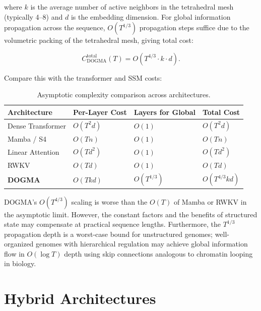 where $k$ is the average number of active neighbors in the tetrahedral mesh (typically 4--8) and $d$ is the embedding dimension. For global information propagation across the sequence, $O(T^{1/3})$ propagation steps suffice due to the volumetric packing of the tetrahedral mesh, giving total cost:

\begin{equation}
C_{\text{DOGMA}}^{\text{total}}(T) = O(T^{4/3} \cdot k \cdot d).
\end{equation}

Compare this with the transformer and SSM costs:

\begin{table}[H]
\centering
\caption{Asymptotic complexity comparison across architectures.}
\label{tab:complexity}
\renewcommand{\arraystretch}{1.15}
\begin{tabularx}{0.95\textwidth}{L{3.5cm} C{3cm} C{2.5cm} Y}
\toprule
\textbf{Architecture} & \textbf{Per-Layer Cost} & \textbf{Layers for Global} & \textbf{Total Cost} \\
\midrule
Dense Transformer & $O(T^2 d)$ & $O(1)$ & $O(T^2 d)$ \\
Mamba / S4 & $O(T n)$ & $O(1)$ & $O(T n)$ \\
Linear Attention & $O(T d^2)$ & $O(1)$ & $O(T d^2)$ \\
RWKV & $O(T d)$ & $O(1)$ & $O(T d)$ \\
\textbf{DOGMA} & $O(T k d)$ & $O(T^{1/3})$ & $O(T^{4/3} k d)$ \\
\bottomrule
\end{tabularx}
\end{table}

\begin{remark}
DOGMA's $O(T^{4/3})$ scaling is worse than the $O(T)$ of Mamba or RWKV in the asymptotic limit. However, the constant factors and the benefits of structured state may compensate at practical sequence lengths. Furthermore, the $T^{1/3}$ propagation depth is a worst-case bound for unstructured genomes; well-organized genomes with hierarchical regulation may achieve global information flow in $O(\log T)$ depth using skip connections analogous to chromatin looping in biology.
\end{remark}

\section{Hybrid Architectures}
\label{sec:hybrid}

